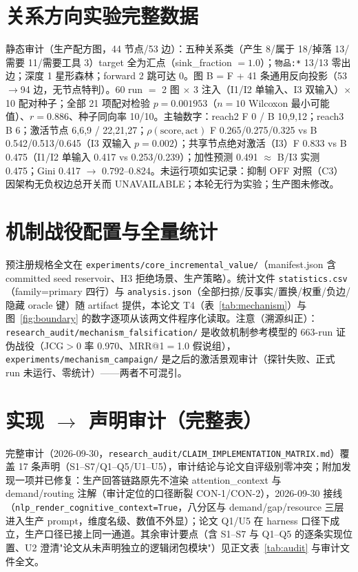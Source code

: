 \documentclass[10pt,a4paper]{ctexart}
\begin{document}
\section{关系方向实验完整数据}
\label{app:reldir}
静态审计（生产配方图，44 节点/53 边）：五种关系类（产生 8/属于 18/掉落 13/需要 11/需要工具 3）target 全为汇点（sink\_fraction $=1.0$）；\texttt{物品:*} 13/13 零出边；深度 1 星形森林；forward 2 跳可达 0。图 B = F + 41 条通用反向投影（53$\rightarrow$94 边，无节点特判）。60 run $=$ 2 图 $\times$ 3 注入（I1/I2 单输入、I3 双输入）$\times$ 10 配对种子；全部 21 项配对检验 $p{=}0.001953$（$n{=}10$ Wilcoxon 最小可能值）、$r{=}0.886$、种子同向率 10/10。主轴数字：reach2 F 0 / B 10,9,12；reach3 B 6；激活节点 6,6,9 / 22,21,27；$\rho(\mathrm{score},\mathrm{act})$ F 0.265/0.275/0.325 vs B 0.542/0.513/0.645（I3 双输入 $p{=}0.002$）；共享节点绝对激活（I3）F 0.833 vs B 0.475（I1/I2 单输入 0.417 vs 0.253/0.239）；加性预测 0.491 $\approx$ B/I3 实测 0.475；Gini 0.417 $\rightarrow$ 0.792--0.824。未运行项如实记录：抑制 OFF 对照（C3）因架构无负权边总开关而 UNAVAILABLE；本轮无行为实验；生产图未修改。

\section{机制战役配置与全量统计}
\label{app:civ}
预注册规格全文在 \texttt{experiments/core\_incremental\_value/}（manifest.json 含 committed seed reservoir、H3 拒绝场景、生产策略）。统计文件 \texttt{statistics.csv}（family=primary 四行）与 \texttt{analysis.json}（全部扫掠/反事实/置换/权重/负边/隐藏 oracle 键）随 artifact 提供，本论文 T4（表~\ref{tab:mechanism}）与图~\ref{fig:boundary} 的数字逐项从该两文件程序化读取。注意（溯源纠正）：\texttt{research\_audit/mechanism\_falsification/} 是收敛机制参考模型的 663-run 证伪战役（JCG$>$0 率 0.970、MRR@1$=$1.0 假说组），\texttt{experiments/mechanism\_campaign/} 是之后的激活景观审计（探针失败、正式 run 未运行、零统计）——两者不可混引。

\section{实现 $\rightarrow$ 声明审计（完整表）}
\label{app:audit}
完整审计（2026-09-30，\texttt{research\_audit/CLAIM\_IMPLEMENTATION\_MATRIX.md}）覆盖 17 条声明（S1--S7/Q1--Q5/U1--U5），审计结论与论文自评级别零冲突；附加发现一项并已修复：生产回答链路原先不渲染 attention\_context 与 demand/routing 注解（审计定位的口径断裂 CON-1/CON-2），2026-09-30 接线（\texttt{nlp\_render\_cognitive\_context=True}，八分区与 demand/gap/resource 三层进入生产 prompt，维度名级、数值不外显）；论文 Q1/U5 在 harness 口径下成立，生产口径已接上同一通道。其余审计要点（含 S1--S7 与 Q1--Q5 的逐条实现位置、U2 澄清"论文从未声明独立的逻辑闭包模块"）见正文表~\ref{tab:audit} 与审计文件全文。
\end{document}
